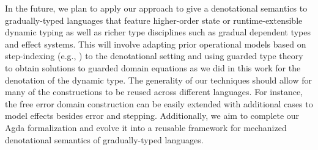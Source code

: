In the future, we plan to apply our approach to give a denotational semantics
to gradually-typed languages that feature higher-order state or runtime-extensible dynamic
typing \cite{DBLP:journals/corr/abs-2210-02169} as well as richer type
disciplines such as gradual dependent types and effect systems. This will
involve adapting prior operational models based on step-indexing (e.g.,
\cite{new-giovannini-licata-2022}) to the denotational setting and using guarded
type theory to obtain solutions to guarded domain equations as we did in this
work for the denotation of the dynamic type. The generality of our techniques
should allow for many of the constructions to be reused across different
languages. For instance, the free error domain construction can be easily
extended with additional cases to model effects besides error and stepping.
Additionally, we aim to complete our Agda formalization and evolve it into a
reusable framework for mechanized denotational semantics of gradually-typed
languages.



